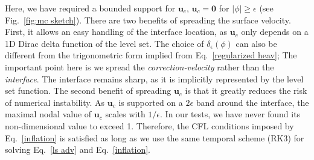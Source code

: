  Here, we have required a bounded support for ${\bm u}_c$, \ie ${\bm u}_c = {\bm 0}$ for $|\phi| \geqslant \epsilon$ (see Fig.\ \ref{fig:mc sketch}). There are two benefits of spreading the surface velocity. First, it allows an easy handling of the interface location, as ${\bm u}_c$ only depends on a 1D Dirac delta function of the level set. The choice of $\delta_\epsilon(\phi)$ can also be different from the trigonometric form implied from Eq.\ \eqref{regularized heav}; %
 The important point here is we spread the \textit{correction-velocity} rather than the \textit{interface}. The interface remains sharp, as it is implicitly represented by the level set function. The second benefit of spreading ${\bm u}_c$ is that it greatly reduces the risk of numerical instability. As ${\bm u}_c$ is supported on a $2\epsilon$ band around the interface, the maximal nodal value of ${\bm u}_c$ scales with $1/\epsilon$. In our tests, we have never found its non-dimensional value to exceed 1. Therefore, the CFL conditions imposed by Eq.\ \eqref{inflation} is satisfied as long as we use the same temporal scheme (\eg RK3) for solving Eq.\ \eqref{ls adv} and Eq.\ \eqref{inflation}.

